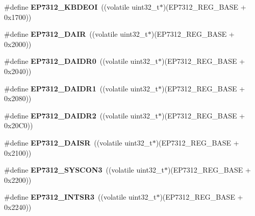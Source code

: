 \begin{DoxyCompactItemize}
\#define {\bfseries E\+P7312\+\_\+\+K\+B\+D\+E\+OI}~((volatile uint32\+\_\+t$\ast$)(E\+P7312\+\_\+\+R\+E\+G\+\_\+\+B\+A\+SE + 0x1700))
\item 
\mbox{\label{group__edb7312__registers_gaf405c65553032b0879395fa1a8944208}} 
\#define {\bfseries E\+P7312\+\_\+\+D\+A\+IR}~((volatile uint32\+\_\+t$\ast$)(E\+P7312\+\_\+\+R\+E\+G\+\_\+\+B\+A\+SE + 0x2000))
\item 
\mbox{\label{group__edb7312__registers_ga87f92bba28ce2745ddf0e8d0d049b633}} 
\#define {\bfseries E\+P7312\+\_\+\+D\+A\+I\+D\+R0}~((volatile uint32\+\_\+t$\ast$)(E\+P7312\+\_\+\+R\+E\+G\+\_\+\+B\+A\+SE + 0x2040))
\item 
\mbox{\label{group__edb7312__registers_ga4626ce4bb88065509d0a23afa5200cb7}} 
\#define {\bfseries E\+P7312\+\_\+\+D\+A\+I\+D\+R1}~((volatile uint32\+\_\+t$\ast$)(E\+P7312\+\_\+\+R\+E\+G\+\_\+\+B\+A\+SE + 0x2080))
\item 
\mbox{\label{group__edb7312__registers_ga8c7de7ac94a4a7762428737635e8bd8c}} 
\#define {\bfseries E\+P7312\+\_\+\+D\+A\+I\+D\+R2}~((volatile uint32\+\_\+t$\ast$)(E\+P7312\+\_\+\+R\+E\+G\+\_\+\+B\+A\+SE + 0x20\+C0))
\item 
\mbox{\label{group__edb7312__registers_gaff2d416e9dbc5acb23b7532fa637675e}} 
\#define {\bfseries E\+P7312\+\_\+\+D\+A\+I\+SR}~((volatile uint32\+\_\+t$\ast$)(E\+P7312\+\_\+\+R\+E\+G\+\_\+\+B\+A\+SE + 0x2100))
\item 
\mbox{\label{group__edb7312__registers_gab2f3c7da2c02bd2e8747fa02a1841a30}} 
\#define {\bfseries E\+P7312\+\_\+\+S\+Y\+S\+C\+O\+N3}~((volatile uint32\+\_\+t$\ast$)(E\+P7312\+\_\+\+R\+E\+G\+\_\+\+B\+A\+SE + 0x2200))
\item 
\mbox{\label{group__edb7312__registers_gab46cecfe3677145feb41c93eb7c4bbf4}} 
\#define {\bfseries E\+P7312\+\_\+\+I\+N\+T\+S\+R3}~((volatile uint32\+\_\+t$\ast$)(E\+P7312\+\_\+\+R\+E\+G\+\_\+\+B\+A\+SE + 0x2240))
\item 
\mbox{\label{group__edb7312__registers_gaef8e1a3ffa7810412547506112aa9546}} 

\end{DoxyCompactItemize}
